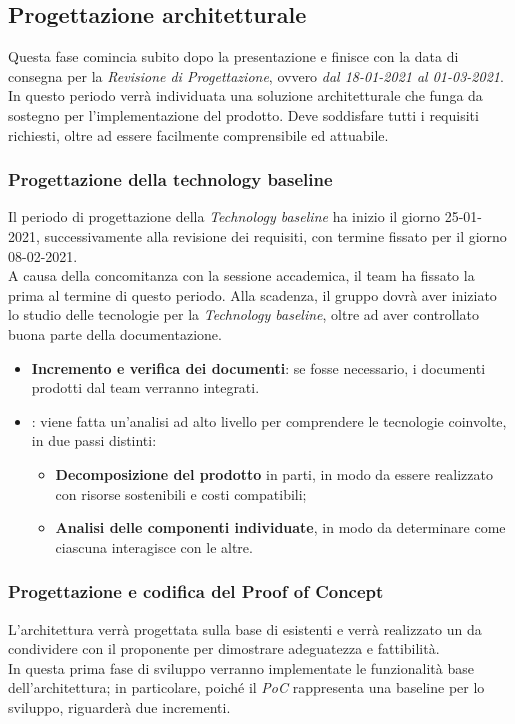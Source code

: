 \subsection{Progettazione architetturale}
Questa fase comincia subito dopo la presentazione e finisce con la data di consegna per la \textit{Revisione di Progettazione}, ovvero \textit{dal 18-01-2021 al 01-03-2021}.\\
In questo periodo verrà individuata una soluzione architetturale che funga da sostegno per l'implementazione del prodotto. Deve soddisfare tutti i requisiti richiesti, oltre ad essere facilmente comprensibile ed attuabile. 

\subsubsection{Progettazione della technology baseline}

Il periodo di progettazione della \textit{Technology baseline} ha inizio il giorno 25-01-2021, successivamente alla revisione dei requisiti, con termine fissato per il giorno 08-02-2021. \\ A causa della concomitanza con la sessione accademica, il team ha fissato la prima  al termine di questo periodo. Alla scadenza, il gruppo dovrà aver iniziato lo studio delle tecnologie per la \textit{Technology baseline}, oltre ad aver controllato buona parte della documentazione.

\begin{itemize}
\item \textbf{Incremento e verifica dei documenti}: se fosse necessario, i documenti prodotti dal team verranno integrati.

 \item {}: viene fatta un'analisi ad alto livello per comprendere le tecnologie coinvolte, in due passi distinti:
\begin{itemize}
 \item \textbf{Decomposizione del prodotto} in parti, in modo da essere realizzato con risorse sostenibili e costi compatibili;
 \item \textbf{Analisi delle componenti individuate}, in modo da determinare come ciascuna interagisce con le altre.  
 
\end{itemize}
\end{itemize}

\subsubsection{Progettazione e codifica del Proof of Concept}
L'architettura verrà progettata sulla base di  esistenti e verrà realizzato un  da condividere con il proponente per dimostrare adeguatezza e fattibilità. \\ 
In questa prima fase di sviluppo verranno implementate le funzionalità base dell'architettura; in particolare, poiché il \textit{PoC} rappresenta una baseline per lo sviluppo, riguarderà due incrementi.

